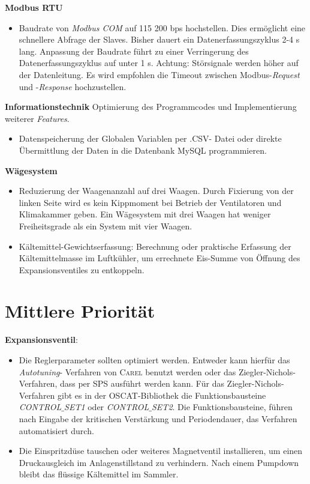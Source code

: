 	
\textbf{Modbus RTU}
\begin{itemize}

\item Baudrate von \textit{Modbus COM} auf 115 200 bps hochstellen. Dies ermöglicht eine schnellere Abfrage der Slaves. Bisher dauert ein Datenerfassungszyklus 2-4 s lang. Anpassung der Baudrate führt zu einer Verringerung des Datenerfassungszyklus auf  unter 1 s. Achtung: Störsignale werden höher auf der Datenleitung. Es wird empfohlen die Timeout zwischen Modbus-\textit{Request} und -\textit{Response} hochzustellen.
\end{itemize}	 

\textbf{Informationstechnik}
Optimierung des Programmcodes und Implementierung weiterer \textit{Features}. 
\begin{itemize}
\item Datenspeicherung der Globalen Variablen per .CSV- Datei oder direkte Übermittlung der Daten in die Datenbank MySQL programmieren.
\end{itemize}

\textbf{Wägesystem}

\begin{itemize}
\item Reduzierung der Waagenanzahl  auf drei Waagen. Durch Fixierung von der linken Seite wird es kein Kippmoment bei Betrieb der Ventilatoren und Klimakammer geben. Ein Wägesystem mit drei Waagen hat weniger Freiheitsgrade als ein System mit vier Waagen.

\item  Kältemittel-Gewichtserfassung: Berechnung oder praktische Erfassung der Kältemittelmasse im Luftkühler, um errechnete Eis-Summe von Öffnung des Expansionsventiles zu entkoppeln.
\end{itemize}

\section*{Mittlere Priorität}

	\textbf{Expansionsventil}: 
	\begin{itemize}
	 \item Die Reglerparameter sollten optimiert werden. Entweder kann hierfür das \textit{Autotuning}- Verfahren von \textsc{Carel} benutzt werden oder das Ziegler-Nichols-Verfahren, dass per SPS ausführt werden kann. Für das Ziegler-Nichols-Verfahren gibt es in der OSCAT-Bibliothek die Funktionsbausteine \textit{CONTROL$\_$SET1} oder \textit{CONTROL$\_$SET2}. Die Funktionsbausteine, führen nach Eingabe der kritischen Verstärkung und Periodendauer, das Verfahren automatisiert durch.
	 \item 	Die Einspritzdüse tauschen oder weiteres Magnetventil installieren, um einen Druckausgleich im Anlagenstillstand zu verhindern. Nach einem Pumpdown bleibt das flüssige Kältemittel im Sammler.
	\end{itemize}	

